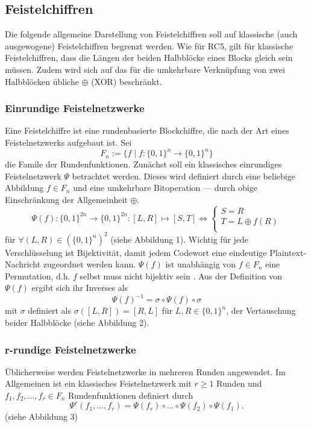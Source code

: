 \documentclass[course=erap]{aspdoc}
\begin{document}
\subsection{Feistelchiffren}

Die folgende allgemeine Darstellung von Feistelchiffren soll auf klassische (auch ausgewogene) Feistelchiffren begrenzt werden. Wie für RC5, gilt für klassische Feistelchiffren, dass die Längen der beiden Halbblöcke eines Blocks gleich sein müssen. Zudem wird sich auf das für die umkehrbare Verknüpfung von zwei Halbblöcken übliche $\oplus$ (XOR) beschränkt.

\subsubsection{Einrundige Feistelnetzwerke}

Eine Feistelchiffre ist eine rundenbasierte Blockchiffre, die nach der Art eines Feistelnetzwerks aufgebaut ist. Sei
\[
    F_n := \{f \mid f \colon \{0, 1\}^n \to \{0, 1\}^n\}
\]
die Famile der Rundenfunktionen. Zunächst soll ein klassisches einrundiges Feistelnetzwerk $\Psi$ betrachtet werden. Dieses wird definiert durch eine beliebige Abbildung $f \in F_n$ und eine umkehrbare Bitoperation --- durch obige Einschränkung der Allgemeinheit $\oplus$.
\[
    \Psi(f) \colon \{0, 1\}^{2n} \to \{0, 1\}^{2n} \colon [L, R] \mapsto [S, T] \Leftrightarrow
        \begin{cases}
            S = R \\
            T = L \oplus f(R) \\
        \end{cases}
\]
für $\forall(L, R) \in (\{0, 1\}^n)^2$ \cite[p.11]{nachef} (siehe Abbildung 1). Wichtig für jede Verschlüsselung ist Bijektivität, damit jedem Codewort eine eindeutige Plaintext-Nachricht zugeordnet werden kann. $\Psi(f)$ ist unabhängig von $f \in F_n$ eine Permutation, d.h. $f$ selbst muss nicht bijektiv sein \cite[p.12]{nachef}. Aus der Definition von $\Psi(f)$ ergibt sich ihr Inverses als
\[
    \Psi(f)^{-1} = \sigma \circ \Psi(f) \circ \sigma
\]
mit $\sigma$ definiert als $\sigma([L, R]) = [R, L]$ für $L, R \in \{0, 1\}^n$, der Vertauschung beider Halbblöcke \cite[p.12]{nachef} (siehe Abbildung 2).

\subsubsection{r-rundige Feistelnetzwerke}

Üblicherweise werden Feistelnetzwerke in mehreren Runden angewendet. Im Allgemeinen ist ein klassisches Feistelnetzwerk mit $r \geq 1$ Runden und $f_1, f_2, ..., f_r \in F_n$ Rundenfunktionen definiert durch
\[
    \Psi^r(f_1, ..., f_r) = \Psi(f_r) \circ ... \circ \Psi(f_2) \circ \Psi(f_1).
\]\cite[p.12]{nachef} (siehe Abbildung 3)
\end{document}
